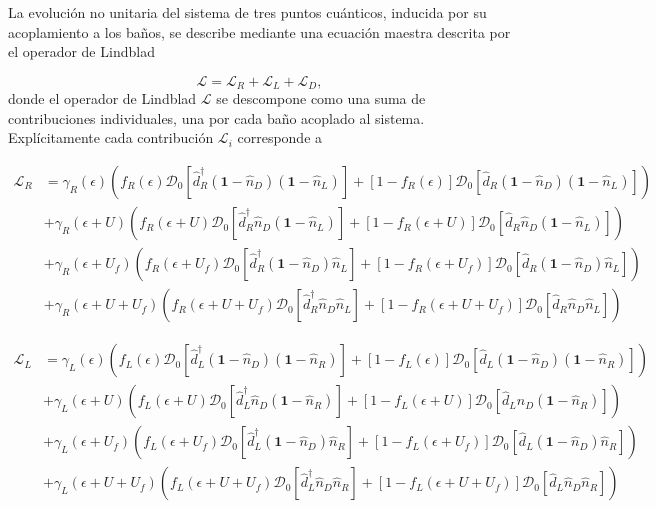 La evolución no unitaria del sistema de tres puntos cuánticos, inducida por su acoplamiento a los baños, se describe mediante una ecuación maestra descrita por el operador de Lindblad

\begin{equation}
    \mathcal{L} = \mathcal{L}_{R} + \mathcal{L}_{L} + \mathcal{L}_{D},
    \label{Lindbladsec5}
\end{equation}
donde el operador de Lindblad $\mathcal{L}$ se descompone como una suma de contribuciones individuales, una por cada baño acoplado al sistema. Explícitamente cada contribución $\mathcal{L}_{i}$ corresponde a 

\begin{align*}
    \mathcal{L}_{R} & = \gamma_{R}(\epsilon)(f_{R}(\epsilon)\mathcal{D}_{0}[\hat{d}^{\dagger}_{R}(\textbf{1}-\hat{n}_{D})(\textbf{1}-\hat{n}_{L}) ]  + [1-f_{R}(\epsilon)]\mathcal{D}_{0}[\hat{d}_{R}(\textbf{1}-\hat{n}_{D})(\textbf{1}-\hat{n}_{L}) ]  )  \\
                    & + \gamma_{R}(\epsilon+U)(f_{R}(\epsilon+U)\mathcal{D}_{0}[\hat{d}^{\dagger}_{R}\hat{n}_{D}(\textbf{1}-\hat{n}_{L}) ]  + [1-f_{R}(\epsilon+U)]\mathcal{D}_{0}[\hat{d}_{R}\hat{n}_{D}(\textbf{1}-\hat{n}_{L}) ]  ) \\
                   & + \gamma_{R}(\epsilon+U_{f})(f_{R}(\epsilon+U_{f})\mathcal{D}_{0}[\hat{d}^{\dagger}_{R}(\textbf{1}-\hat{n}_{D})\hat{n}_{L} ]  + [1-f_{R}(\epsilon+U_{f})]\mathcal{D}_{0}[\hat{d}_{R}(\textbf{1}-\hat{n}_{D})\hat{n}_{L} ]  ) \\
                  & + \gamma_{R}(\epsilon+U+U_{f})(f_{R}(\epsilon+U+U_{f})\mathcal{D}_{0}[\hat{d}^{\dagger}_{R}\hat{n}_{D}\hat{n}_{L} ]  + [1-f_{R}(\epsilon+U+U_{f})]\mathcal{D}_{0}[\hat{d}_{R}\hat{n}_{D}\hat{n}_{L} ]  ) 
\end{align*}

\begin{align*}
    \mathcal{L}_{L} & = \gamma_{L}(\epsilon)(f_{L}(\epsilon)\mathcal{D}_{0}[\hat{d}^{\dagger}_{L}(\textbf{1}-\hat{n}_{D})(\textbf{1}-\hat{n}_{R}) ]  + [1-f_{L}(\epsilon)]\mathcal{D}_{0}[\hat{d}_{L}(\textbf{1}-\hat{n}_{D})(\textbf{1}-\hat{n}_{R}) ]  )  \\
                    & + \gamma_{L}(\epsilon+U)(f_{L}(\epsilon+U)\mathcal{D}_{0}[\hat{d}^{\dagger}_{L}\hat{n}_{D}(\textbf{1}-\hat{n}_{R}) ]  + [1-f_{L}(\epsilon+U)]\mathcal{D}_{0}[\hat{d}_{L}\hat{n}_{D}(\textbf{1}-\hat{n}_{R}) ]  ) \\
                   & + \gamma_{L}(\epsilon+U_{f})(f_{L}(\epsilon+U_{f})\mathcal{D}_{0}[\hat{d}^{\dagger}_{L}(\textbf{1}-\hat{n}_{D})\hat{n}_{R} ]  + [1-f_{L}(\epsilon+U_{f})]\mathcal{D}_{0}[\hat{d}_{L}(\textbf{1}-\hat{n}_{D})\hat{n}_{R} ]  ) \\
                  & + \gamma_{L}(\epsilon+U+U_{f})(f_{L}(\epsilon+U+U_{f})\mathcal{D}_{0}[\hat{d}^{\dagger}_{L}\hat{n}_{D}\hat{n}_{R} ]  + [1-f_{L}(\epsilon+U+U_{f})]\mathcal{D}_{0}[\hat{d}_{L}\hat{n}_{D}\hat{n}_{R} ]  ) 
\end{align*}

